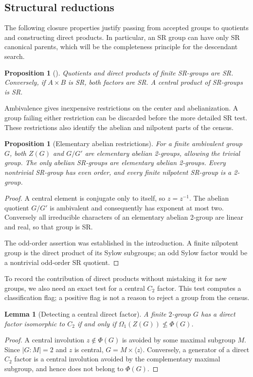 \documentclass[11pt,a4paper]{amsart}
\newtheorem{lemma}[thm]{Lemma}
\newtheorem{prop}[thm]{Proposition}
\theoremstyle{definition}
\theoremstyle{remark}
\numberwithin{equation}{section}
\begin{document}
\subsection{Structural reductions}\label{subsec:structural-reductions}
The following closure properties justify passing from accepted groups
to quotients and constructing direct products. In particular, an SR group
can have only SR canonical parents, which will be the completeness
principle for the descendant search.
\begin{prop}[{\cite[Chapter~XXVI, Exercises~1.7--1.8]{BKZ19}}]\label{prop:closure}
Quotients and direct products of finite SR-groups are SR. Conversely, if
$A\times B$ is SR, both factors are SR. A central product of SR-groups is SR.
\end{prop}


Ambivalence gives inexpensive restrictions on the center and
abelianization. A group failing either restriction can be discarded
before the more detailed SR test. These restrictions also identify the
abelian and nilpotent parts of the census.
\begin{prop}[Elementary abelian restrictions]\label{prop:elementary}
For a finite ambivalent group $G$, both $Z(G)$ and $G/G'$ are elementary
abelian 2-groups, allowing the trivial group. The only abelian SR-groups
are elementary abelian 2-groups. Every nontrivial SR-group has even order,
and every finite nilpotent SR-group is a 2-group.
\end{prop}
\begin{proof}
A central element is conjugate only to itself, so $z=z^{-1}$.
The abelian quotient $G/G'$ is ambivalent and consequently has exponent
at most two. Conversely all irreducible characters of an elementary
abelian 2-group are linear and real, so that group is SR.

The odd-order assertion was established in the introduction.
A finite nilpotent group is the direct product of its Sylow subgroups;
an odd Sylow factor would be a nontrivial odd-order SR quotient.
\end{proof}



To record the contribution of direct products without mistaking it for
new groups, we also need an exact test for a central $C_2$ factor.
This test computes a classification flag; a positive flag is not a reason
to reject a group from the census.
\begin{lemma}[Detecting a central direct factor]\label{lem:c2-factor}
A finite $2$-group $G$ has a direct factor isomorphic to $C_2$ if and
only if $\Omega_1(Z(G))\nleq\Phi(G)$.
\end{lemma}
\begin{proof}
A central involution $z\notin\Phi(G)$ is avoided by some maximal
subgroup $M$. Since $|G:M|=2$ and $z$ is central,
$G=M\times\langle z\rangle$. Conversely, a generator of a direct
$C_2$ factor is a central involution avoided by the complementary
maximal subgroup, and hence does not belong to $\Phi(G)$.
\end{proof}
\end{document}

